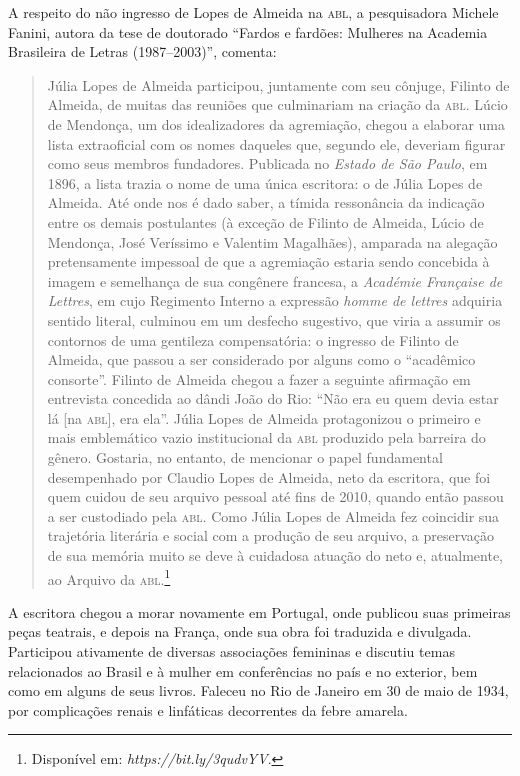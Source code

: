 A respeito do não ingresso de Lopes de Almeida na \textsc{abl}, a pesquisadora Michele Fanini, autora da tese de doutorado ``Fardos e fardões: Mulheres na Academia Brasileira de Letras (1987--2003)'', comenta: 

\begin{quote}
Júlia Lopes de Almeida participou, juntamente com seu cônjuge, Filinto de Almeida, de muitas das reuniões que culminariam na criação da \textsc{abl}. Lúcio de Mendonça, um dos idealizadores da agremiação, chegou a elaborar uma lista extraoficial com os nomes daqueles que, segundo ele, deveriam figurar como seus membros fundadores. Publicada no \textit{Estado de São Paulo}, em 1896, a lista trazia o nome de uma única escritora: o de Júlia Lopes de Almeida. Até onde nos é dado saber, a tímida ressonância da indicação entre os demais postulantes (à exceção de Filinto de Almeida, Lúcio de Mendonça, José Veríssimo e Valentim Magalhães), amparada na alegação pretensamente impessoal de que a agremiação estaria sendo concebida à imagem e semelhança de sua congênere francesa, a \textit{Académie Française de Lettres}, em cujo Regimento Interno a expressão \textit{homme de lettres} adquiria sentido literal, culminou em um desfecho sugestivo, que viria a assumir os contornos de uma gentileza compensatória: o ingresso de Filinto de Almeida, que passou a ser considerado por alguns como o ``acadêmico consorte''. Filinto de Almeida chegou a fazer a seguinte afirmação em entrevista concedida ao dândi João do Rio: ``Não era eu quem devia estar lá [na \textsc{abl}], era ela''. Júlia Lopes de Almeida protagonizou o primeiro e mais emblemático vazio institucional da \textsc{abl} produzido pela barreira do gênero. Gostaria, no entanto, de mencionar o papel fundamental desempenhado por Claudio Lopes de Almeida, neto da escritora, que foi quem cuidou de seu arquivo pessoal até fins de 2010, quando então passou a ser custodiado pela \textsc{abl}. Como Júlia Lopes de Almeida fez coincidir sua trajetória literária e social com a produção de seu arquivo, a preservação de sua memória muito se deve à cuidadosa atuação do neto e, atualmente, ao Arquivo da \textsc{abl}.\footnote{Disponível em: \emph{https://bit.ly/3qudvYV}.}
\end{quote}

A escritora chegou a morar novamente em Portugal, onde publicou suas
primeiras peças teatrais, e depois na França, onde sua obra foi
traduzida e divulgada. Participou ativamente de diversas associações
femininas e discutiu temas relacionados ao Brasil e à mulher em
conferências no país e no exterior, bem como em alguns de seus livros.
Faleceu no Rio de Janeiro em 30 de maio de 1934, por complicações renais e linfáticas decorrentes da febre amarela.

